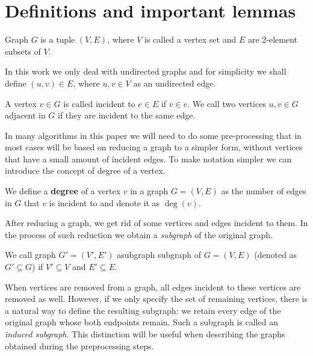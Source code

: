 \section{Definitions and important lemmas} \label{sec:def}
\begin{defn}
\label{defn:graph}
  Graph $G$ is a tuple $(V, E)$, where $V$ is called a vertex set and 
  $E$ are 2-element subsets of $V$.
\end{defn}

In this work we only deal with undirected graphs and for simplicity we 
shall define $(u, v) \in E$, where $u, v \in V$ as an undirected edge.

\begin{defn}
    A vertex $v \in G$ is called incident to $e \in E$ if $v \in e$. We call
    two vertices $u, v \in G$ adjacent in $G$ if they are incident to the same 
    edge.
\end{defn}

In many algorithms in this paper we will need to do some pre-processing that in 
most cases will be based on reducing a graph to a simpler form, without vertices 
that have a small amount of incident edges. To make notation simpler we can introduce 
the concept of degree of a vertex.

\begin{defn}
    We define a \textbf{degree} of a vertex $v$ in a graph $G = (V, E)$ as the number of edges 
    in $G$ that $v$ is incident to and denote it as $\deg(v)$.
\end{defn}

After reducing a graph, we get rid of some vertices and edges incident to them.
In the process of such reduction we obtain a \textit{subgraph} of the original graph.

\begin{defn}
    We call graph $G' = (V', E')$ asubgraph subgraph of $G = (V, E)$ (denoted as $G' \subseteq G$) if 
    $V' \subseteq V$ and $E' \subseteq E$.
\end{defn}

When vertices are removed from a graph, all edges incident to these vertices are
removed as well. However, if we only specify the set of remaining vertices, there
is a natural way to define the resulting subgraph: we retain every edge of the original
graph whose both endpoints remain. Such a subgraph is called an \textit{induced subgraph}.
This distinction will be useful when describing the graphs obtained
during the preprocessing steps.


